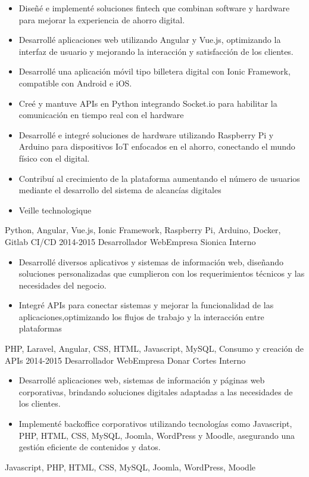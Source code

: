 \begin{experiences}
{          \begin{itemize}
              \item Diseñé e implementé soluciones fintech que combinan software y hardware para mejorar la experiencia de ahorro digital.
              \item Desarrollé aplicaciones web utilizando Angular y Vue.js, optimizando la interfaz de usuario y mejorando la interacción y satisfacción de los clientes.
              \item  Desarrollé una aplicación móvil tipo billetera digital con Ionic Framework, compatible con Android e iOS.
              \item Creé y mantuve APIs en Python integrando Socket.io para habilitar la comunicación en tiempo real con el hardware
              \item Desarrollé e integré soluciones de hardware utilizando Raspberry Pi y Arduino para dispositivos IoT enfocados en el ahorro, conectando el mundo físico con el digital.
              \item Contribuí al crecimiento de la plataforma aumentando el número de usuarios mediante el desarrollo del sistema de alcancías digitales
              \item Veille technologique                      
            \end{itemize}
        }
        {
          Python, Angular, Vue.js, Ionic Framework, Raspberry Pi, Arduino, Docker, Gitlab CI/CD
        }
  \emptySeparator
  \experience
    {2014-2015} {Desarrollador Web}{Empresa Sionica} {Interno}
    {} {
        \begin{itemize}
          \item Desarrollé diversos aplicativos y sistemas de información web, diseñando soluciones personalizadas que cumplieron con los requerimientos técnicos y las necesidades del negocio.
          \item Integré APIs para conectar sistemas y mejorar la funcionalidad de las aplicaciones,optimizando los flujos de trabajo y la interacción entre plataformas
        \end{itemize}
      }
      {PHP, Laravel, Angular, CSS, HTML, Javascript, MySQL, Consumo y creación de APIs}
  \emptySeparator
  \experience
    {2014-2015} {Desarrollador Web}{Empresa Donar Cortes} {Interno}
    {} {
        \begin{itemize}
          \item Desarrollé aplicaciones web, sistemas de información y páginas web corporativas, brindando soluciones digitales adaptadas a las necesidades de los clientes.
          \item Implementé backoffice corporativos utilizando tecnologías como Javascript, PHP, HTML, CSS, MySQL, Joomla, WordPress y Moodle, asegurando una gestión eficiente de contenidos y datos.
        \end{itemize}
      }
      {Javascript, PHP, HTML, CSS, MySQL, Joomla, WordPress, Moodle}
  \emptySeparator


\end{experiences}
